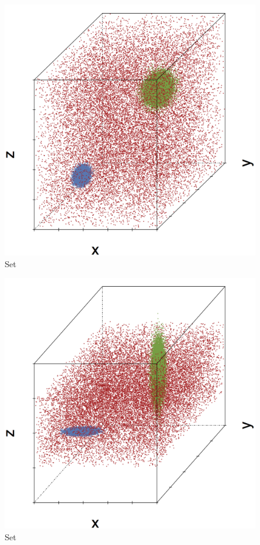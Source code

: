 \begin{subfigure}{0.23\textwidth}
	\centering
	\includegraphics[width=\textwidth]{experiment/img/datasetplot_ferdosi_2_60000.png}
	\caption{Set \ferdosiTwo}
	\label{fig:3:simulated:datasets:ferdosi2}
\end{subfigure}	
\begin{subfigure}{0.23\textwidth}
	\centering
	\includegraphics[width=\textwidth]{experiment/img/datasetplot_baakman_2_60000.png}
	\caption{Set \baakmanTwo}
	\label{fig:3:simulated:datasets:baakman2}
\end{subfigure}	
